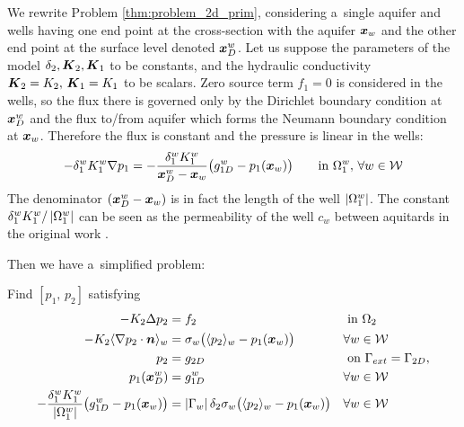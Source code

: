 We rewrite Problem \ref{thm:problem_2d_prim}, considering a~single aquifer and wells having one end point
at the cross-section with the aquifer $\mathbf{\boldsymbol{x}}_w$ and the other end point at the surface level denoted $\mathbf{\boldsymbol{x}}^w_D$.
Let us suppose the parameters of the model $\delta_2, \mathbf{\boldsymbol{K}}_2, \mathbf{\boldsymbol{K}}_1$ to be constants, and
the hydraulic conductivity $\mathbf{\boldsymbol{K}}_2 = K_2,\, \mathbf{\boldsymbol{K}}_1 = K_1$ to be scalars.
Zero source term $f_1=0$ is considered in the wells, so the flux there is governed only by the Dirichlet
boundary condition at $\mathbf{\boldsymbol{x}}^w_D$ and the flux to/from aquifer which forms the Neumann boundary condition at $\mathbf{\boldsymbol{x}}_w$.
Therefore the flux is constant and the pressure is linear in the wells:
\begin{equation} \label{eqn:linear_pressure_in_1d}
    -\delta^w_1 K^w_1 \nabla p_1 = -\frac{\delta^w_1 K^w_1}{\mathbf{\boldsymbol{x}}^w_D-\mathbf{\boldsymbol{x}}_w} \big( g^w_{1D} - p_1(\mathbf{\boldsymbol{x}}_w) \big) \qquad \textrm{in } \Omega^w_1,\,\forall w\in\mathcal{W}
\end{equation}
The denominator $(\mathbf{\boldsymbol{x}}^w_D-\mathbf{\boldsymbol{x}}_w)$ is in fact the length of the well $\left|\Omega^w_1\right|$.
The constant ${\delta^w_1 K^w_1}/\left|\Omega^w_1\right|$ can be seen as the permeability of the well $c_w$ between aquitards
in the original work \cite{exner_2016}.

Then we have a~simplified problem:
\begin{thmproblem} \label{thm:prim_simple_problem}
Find $[p_1,\,p_2]$ satisfying
\begin{subequations}
\begin{align}
-K_2 \Delta p_2 &= f_2 && \textrm{ in } \Omega_2 \label{eqn:prim_simple_poisson}\\
-K_2\langle\nabla p_2 \cdot \mathbf{\boldsymbol{n}}\rangle_w &= \sigma_w\big( \langle p_2\rangle_w - p_1(\mathbf{\boldsymbol{x}}_w)\big)
    && \forall w\in\mathcal{W} \label{eqn:prim_simple_well_edge_bc} \\
p_2 &= g_{2D} && \textrm{ on } \Gamma_{ext} = \Gamma_{2D}, \label{eqn:prim_simple_dirichlet} \\
p_1(\mathbf{\boldsymbol{x}}^w_D) &= g^w_{1D} && \forall w\in\mathcal{W} \label{eqn:prim_simple_well_top_bc} \\
-\frac{\delta^w_1 K^w_1}{\left|\Omega^w_1\right|} \big(g^w_{1D} - p_1(\mathbf{\boldsymbol{x}}_w)\big) &=  \left|\Gamma_w\right| \delta_2 \sigma_w\big( \langle p_2\rangle_w - p_1(\mathbf{\boldsymbol{x}}_w)\big) 
    && \forall w\in\mathcal{W}\label{eqn:prim_simple_well_flow}
\end{align}
\end{subequations}
%
%
% 
\end{thmproblem}

